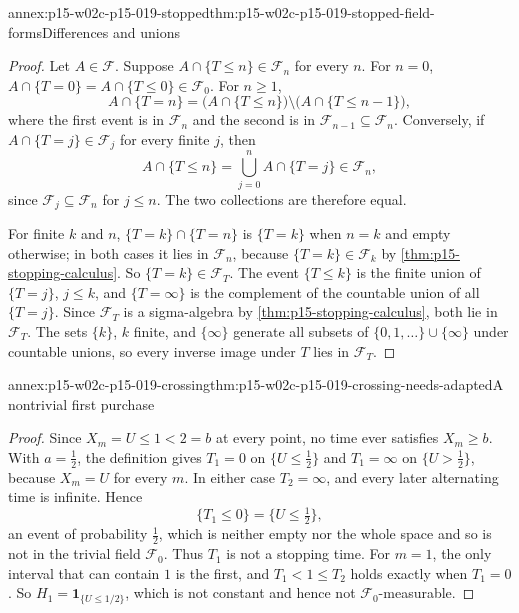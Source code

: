 \begin{annexitem}{annex:p15-w02c-p15-019-stopped}{thm:p15-w02c-p15-019-stopped-field-forms}{Differences and unions}
\begin{proof}
Let \(A\in\mathcal F\). Suppose \(A\cap\{T\leq n\}\in\mathcal F_n\) for
every \(n\). For \(n=0\), \(A\cap\{T=0\}=A\cap\{T\leq0\}\in\mathcal F_0\).
For \(n\geq1\),
\[
 A\cap\{T=n\}=\bigl(A\cap\{T\leq n\}\bigr)\setminus
                 \bigl(A\cap\{T\leq n-1\}\bigr),
\]
where the first event is in \(\mathcal F_n\) and the second is in
\(\mathcal F_{n-1}\subseteq\mathcal F_n\). Conversely, if
\(A\cap\{T=j\}\in\mathcal F_j\) for every finite \(j\), then
\[
 A\cap\{T\leq n\}=\bigcup_{j=0}^nA\cap\{T=j\}\in\mathcal F_n,
\]
since \(\mathcal F_j\subseteq\mathcal F_n\) for \(j\leq n\). The two
collections are therefore equal.

For finite \(k\) and \(n\), \(\{T=k\}\cap\{T=n\}\) is \(\{T=k\}\) when
\(n=k\) and empty otherwise; in both cases it lies in \(\mathcal F_n\),
because \(\{T=k\}\in\mathcal F_k\) by \cref{thm:p15-stopping-calculus}.
So \(\{T=k\}\in\mathcal F_T\). The event \(\{T\leq k\}\) is the finite
union of \(\{T=j\}\), \(j\leq k\), and \(\{T=\infty\}\) is the complement
of the countable union of all \(\{T=j\}\). Since \(\mathcal F_T\) is a
sigma-algebra by \cref{thm:p15-stopping-calculus}, both lie in
\(\mathcal F_T\). The sets \(\{k\}\), \(k\) finite, and \(\{\infty\}\)
generate all subsets of \(\{0,1,\ldots\}\cup\{\infty\}\) under countable
unions, so every inverse image under \(T\) lies in \(\mathcal F_T\).
\end{proof}
\end{annexitem}

\begin{annexitem}{annex:p15-w02c-p15-019-crossing}{thm:p15-w02c-p15-019-crossing-needs-adapted}{A nontrivial first purchase}
\begin{proof}
Since \(X_m=U\leq1<2=b\) at every point, no time ever satisfies
\(X_m\geq b\). With \(a=\tfrac12\), the definition gives \(T_1=0\) on
\(\{U\leq\tfrac12\}\) and \(T_1=\infty\) on \(\{U>\tfrac12\}\), because
\(X_m=U\) for every \(m\). In either case \(T_2=\infty\), and every later
alternating time is infinite. Hence
\[
                     \{T_1\leq0\}=\{U\leq\tfrac12\},
\]
an event of probability \(\tfrac12\), which is neither empty nor the
whole space and so is not in the trivial field \(\mathcal F_0\). Thus
\(T_1\) is not a stopping time. For \(m=1\), the only interval that can
contain \(1\) is the first, and \(T_1<1\leq T_2\) holds exactly when
\(T_1=0\). So \(H_1=\mathbf1_{\{U\leq1/2\}}\), which is not constant and
hence not \(\mathcal F_0\)-measurable.
\end{proof}
\end{annexitem}


